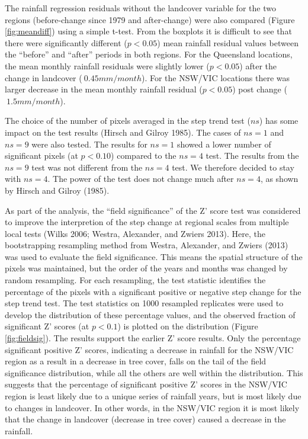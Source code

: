 \documentclass[fleqn,10pt,lineno]{wlpeerj} %
\begin{document}
The rainfall regression residuals without the landcover variable for the
two regions (before-change since 1979 and after-change) were also
compared (Figure \ref{fig:meandiff}) using a simple t-test. From the
boxplots it is difficult to see that there were significantly different
(\(p < 0.05\)) mean rainfall residual values between the ``before'' and
``after'' periods in both regions. For the Queensland locations, the
mean monthly rainfall residuals were slightly lower (\(p < 0.05\)) after
the change in landcover (\(~ 0.45 mm/month\)). For the NSW/VIC locations
there was larger decrease in the mean monthly rainfall residual
(\(p < 0.05\)) post change (\(~ 1.5 mm/month\)).

The choice of the number of pixels averaged in the step trend test
(\(ns\)) has some impact on the test results (Hirsch and Gilroy 1985).
The cases of \(ns = 1\) and \(ns = 9\) were also tested. The results for
\(ns = 1\) showed a lower number of significant pixels (at \(p< 0.10\))
compared to the \(ns = 4\) test. The results from the \(ns = 9\) test
was not different from the \(ns = 4\) test. We therefore decided to stay
with \(ns = 4\). The power of the test does not change much after
\(ns = 4\), as shown by Hirsch and Gilroy (1985).

As part of the analysis, the ``field significance'' of the Z' score test
was considered to improve the interpretion of the step change at
regional scales from multiple local tests (Wilks 2006; Westra,
Alexander, and Zwiers 2013). Here, the bootstrapping resampling method
from Westra, Alexander, and Zwiers (2013) was used to evaluate the field
significance. This means the spatial structure of the pixels was
maintained, but the order of the years and months was changed by random
resampling. For each resampling, the test statistic identifies the
percentage of the pixels with a significant positive or negative step
change for the step trend test. The test statistics on 1000 resampled
replicates were used to develop the distribution of these percentage
values, and the observed fraction of significant Z' scores (at
\(p < 0.1\)) is plotted on the distribution (Figure \ref{fig:fieldsig}).
The results support the earlier Z' score results. Only the percentage
significant positive Z' scores, indicating a decrease in rainfall for
the NSW/VIC region as a result in a decrease in tree cover, falls on the
tail of the field significance distribution, while all the others are
well within the distribution. This suggests that the percentage of
significant positive Z' scores in the NSW/VIC region is least likely due
to a unique series of rainfall years, but is most likely due to changes
in landcover. In other words, in the NSW/VIC region it is most likely
that the change in landcover (decrease in tree cover) caused a decrease
in the rainfall.
\end{document}
